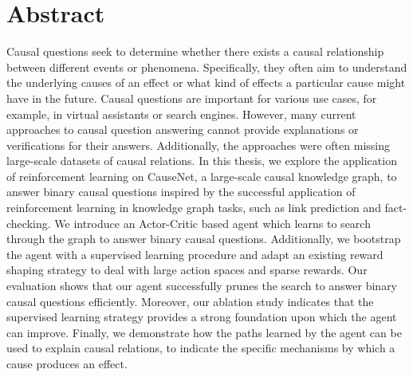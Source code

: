 \chapter*{Abstract}
Causal questions seek to determine whether there exists a causal relationship 
between different events or phenomena. 
Specifically, they often aim to understand the underlying causes of an effect or what kind of effects a particular cause might have in the future.
Causal questions are important for various use cases, for example, in virtual assistants or search engines.
However, many current approaches to causal question answering cannot provide explanations or verifications for their answers. 
Additionally, the approaches were often missing 
large-scale datasets of causal relations.
In this thesis, we explore the application of reinforcement learning on CauseNet, a large-scale causal knowledge graph, to answer binary causal questions inspired by the successful application of reinforcement learning in knowledge graph tasks, such as link prediction and fact-checking.
We introduce an Actor-Critic based agent which learns to search through the graph to answer binary causal questions.
Additionally, we bootstrap the agent with a supervised learning procedure and adapt an existing reward shaping strategy to deal 
with large action spaces and sparse rewards.
Our evaluation shows that our agent successfully prunes the search to answer binary causal questions efficiently.
Moreover, our ablation study indicates that the supervised learning strategy provides a strong foundation upon which the agent can improve.
Finally, we demonstrate how the paths learned by the agent can be used to explain causal relations, to indicate the specific mechanisms by which a cause produces an effect.
